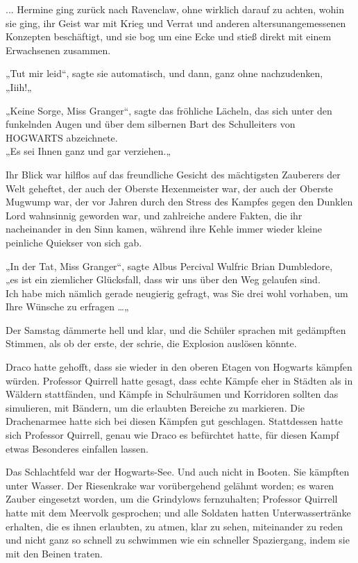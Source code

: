 {... Hermine ging zurück nach Ravenclaw, ohne wirklich darauf zu achten, wohin sie ging, ihr Geist war mit Krieg und Verrat und anderen altersunangemessenen Konzepten beschäftigt, und sie bog um eine Ecke und stieß direkt mit einem Erwachsenen zusammen.

„Tut mir leid“, sagte sie automatisch, und dann, ganz ohne nachzudenken,\\ „Iiih!„

„Keine Sorge, Miss Granger“, sagte das fröhliche Lächeln, das sich unter den funkelnden Augen und über dem silbernen Bart des Schulleiters von HOGWARTS abzeichnete.\\ „Es sei Ihnen ganz und gar verziehen.„

Ihr Blick war hilflos auf das freundliche Gesicht des mächtigsten Zauberers der Welt geheftet, der auch der Oberste Hexenmeister war, der auch der Oberste Mugwump war, der vor Jahren durch den Stress des Kampfes gegen den Dunklen Lord wahnsinnig geworden war, und zahlreiche andere Fakten, die ihr nacheinander in den Sinn kamen, während ihre Kehle immer wieder kleine peinliche Quiekser von sich gab.

„In der Tat, Miss Granger“, sagte Albus Percival Wulfric Brian Dumbledore,\\ „es ist ein ziemlicher Glücksfall, dass wir uns über den Weg gelaufen sind.\\ Ich habe mich nämlich gerade neugierig gefragt, was Sie drei wohl vorhaben, um Ihre Wünsche zu erfragen …„

Der Samstag dämmerte hell und klar, und die Schüler sprachen mit gedämpften Stimmen, als ob der erste, der schrie, die Explosion auslösen könnte.

Draco hatte gehofft, dass sie wieder in den oberen Etagen von Hogwarts kämpfen würden. Professor Quirrell hatte gesagt, dass echte Kämpfe eher in Städten als in Wäldern stattfänden, und Kämpfe in Schulräumen und Korridoren sollten das simulieren, mit Bändern, um die erlaubten Bereiche zu markieren. Die Drachenarmee hatte sich bei diesen Kämpfen gut geschlagen. Stattdessen hatte sich Professor Quirrell, genau wie Draco es befürchtet hatte, für diesen Kampf etwas Besonderes einfallen lassen.

Das Schlachtfeld war der Hogwarts-See. Und auch nicht in Booten. Sie kämpften unter Wasser. Der Riesenkrake war vorübergehend gelähmt worden; es waren Zauber eingesetzt worden, um die Grindylows fernzuhalten; Professor Quirrell hatte mit dem Meervolk gesprochen; und alle Soldaten hatten Unterwassertränke erhalten, die es ihnen erlaubten, zu atmen, klar zu sehen, miteinander zu reden und nicht ganz so schnell zu schwimmen wie ein schneller Spaziergang, indem sie mit den Beinen traten.

}
